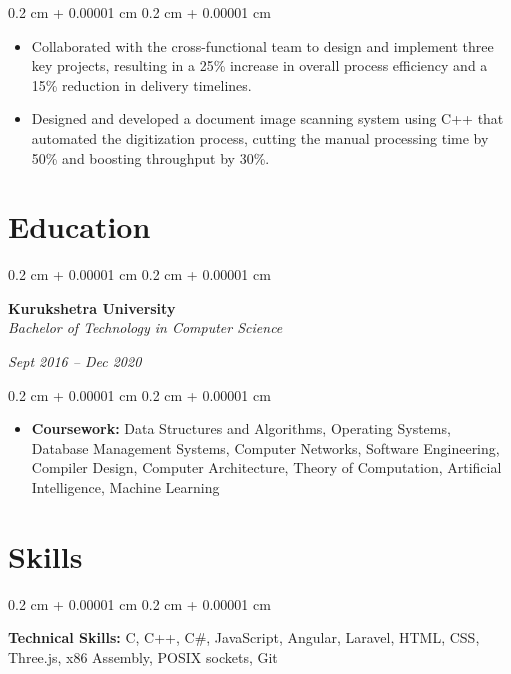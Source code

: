 \documentclass[10pt, letterpaper]{article}
\newenvironment{highlights}{
    \begin{itemize}[
        topsep=0.10 cm,
        parsep=0.10 cm,
        partopsep=0pt,
        itemsep=0pt,
        leftmargin=0.4 cm + 10pt
    ]
}{
    \end{itemize}
} %
\newenvironment{onecolentry}{
    \begin{adjustwidth}{
        0.2 cm + 0.00001 cm
    }{
        0.2 cm + 0.00001 cm
    }
}{
    \end{adjustwidth}
} %
\newenvironment{twocolentry}[2][]{
    \onecolentry
    \def\secondColumn{#2}
    \setcolumnwidth{\fill, 4.5 cm}
    \begin{paracol}{2}
}{
    \switchcolumn \raggedleft \secondColumn
    \end{paracol}
    \endonecolentry
} %
\begin{document}
        \vspace{0.10 cm}
        \begin{onecolentry}
            \begin{highlights}
                \item Collaborated with the cross-functional team to design and implement three key projects, resulting in a 25\% increase in overall process efficiency and a 15\% reduction in delivery timelines.
                \item Designed and developed a document image scanning system using C++ that automated the digitization process, cutting the manual processing time by 50\% and boosting throughput by 30\%.
            \end{highlights}
        \end{onecolentry}

    \section{Education}

        \begin{twocolentry}{
        \textit{Sept 2016 – Dec 2020}}
            \textbf{Kurukshetra University} \\
            \textit{Bachelor of Technology in Computer Science}
        \end{twocolentry}

        \vspace{0.10 cm}
        \begin{onecolentry}
            \begin{highlights}
                \item \textbf{Coursework:} Data Structures and Algorithms, Operating Systems, Database Management Systems, Computer Networks, Software Engineering, Compiler Design, Computer Architecture, Theory of Computation, Artificial Intelligence, Machine Learning
            \end{highlights}
        \end{onecolentry}

    \section{Skills}

    \begin{onecolentry}
        \textbf{Technical Skills:} C, C++, C\#, JavaScript, Angular, Laravel, HTML, CSS, Three.js, x86 Assembly, POSIX sockets, Git \end{onecolentry}
\end{document}
